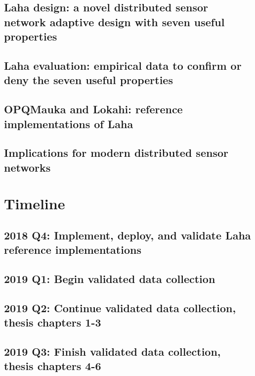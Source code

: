 \subsection{Laha design: a novel distributed sensor network adaptive design with seven useful properties}
\subsection{Laha evaluation: empirical data to confirm or deny the seven useful properties}
\subsection{OPQMauka and Lokahi: reference implementations of Laha}
\subsection{Implications for modern distributed sensor networks}

\section{Timeline}
\subsection{2018 Q4: Implement, deploy, and validate Laha reference implementations}
\subsection{2019 Q1: Begin validated data collection}
\subsection{2019 Q2: Continue validated data collection, thesis chapters 1-3}
\subsection{2019 Q3: Finish validated data collection, thesis chapters 4-6}





